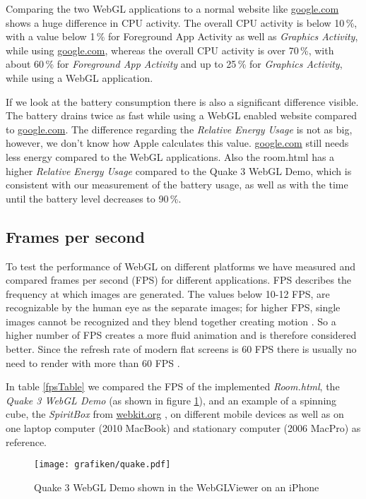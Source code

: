 \documentclass[12pt,journal,compsoc]{IEEEtran}
\begin{document}
Comparing the two WebGL applications to a normal website like \url{google.com} shows a huge difference in CPU activity. The overall CPU activity is below 10\,\%, with a value below 1\,\% for Foreground App Activity as well as \textit{Graphics Activity}, while using \url{google.com}, whereas the overall CPU activity is over 70\,\%, with about 60\,\% for \textit{Foreground App Activity} and up to 25\,\% for \textit{Graphics Activity}, while using a WebGL application. 

If we look at the battery consumption there is also a significant difference visible. The battery drains twice as fast while using a WebGL enabled website compared to \url{google.com}. The difference regarding the \textit{Relative Energy Usage} is not as big, however, we don't know how Apple calculates this value. \url{google.com} still needs less energy compared to the WebGL applications. Also the room.html has a higher \textit{Relative Energy Usage} compared to the Quake 3 WebGL Demo, which is consistent with our measurement of the battery usage, as well as with the time until the battery level decreases to 90\,\%.


\subsection{Frames per second}
To test the performance of WebGL on different platforms we have measured and compared frames per second (FPS) for different applications. FPS describes the frequency at which images are generated. The values below 10-12 FPS, are recognizable by the human eye as the separate images; for higher FPS, single images cannot be recognized and they blend together creating motion \cite{12FPS}. So a higher number of FPS creates a more fluid animation and is therefore considered better. Since the refresh rate of modern flat screens is 60 FPS there is usually no need to render with more than 60 FPS \cite{60fps}.

In table \ref{fpsTable} we compared the FPS of the implemented \textit{Room.html}, the \textit{Quake 3 WebGL Demo} \cite{quakewebgl} (as shown in figure \ref{fig:quake3}), and an example of a spinning cube, the \textit{SpiritBox} from \url {webkit.org} \cite{SpiritBox}, on different mobile devices as well as on one laptop computer (2010 MacBook) and stationary computer (2006 MacPro) as reference. 

\begin{figure}
	\centerline{\texttt{[image: grafiken/quake.pdf]}}
	\caption{Quake 3 WebGL Demo \cite{quakewebgl} shown in the WebGLViewer on an iPhone}
	\label{fig:quake3}
\end{figure}
\end{document}
